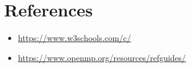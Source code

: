 \documentclass{article}
\begin{document}
	\section{References}
	\begin{itemize}
		\item \href{https://www.w3schools.com/c/}{https://www.w3schools.com/c/}
		\item \href{https://www.openmp.org/resources/refguides/}{https://www.openmp.org/resources/refguides/}
	\end{itemize}
	
\end{document}
